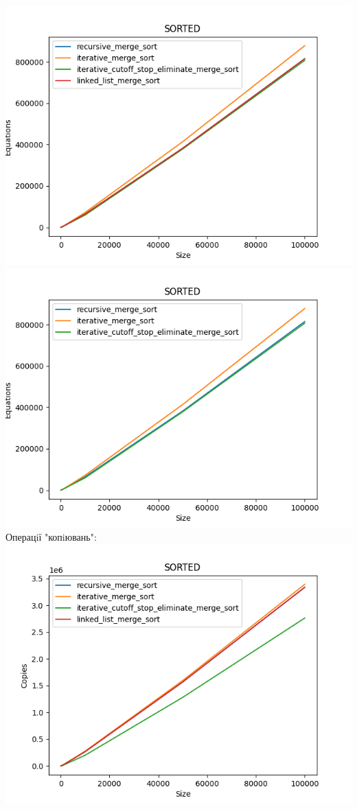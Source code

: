 \documentclass{article}
\begin{document}
        \includegraphics[scale=0.5]{sorted_Equations_4_sorts_6_numbers_50_100to100000.png}
        \includegraphics[scale=0.5]{sorted_Equations_3_sorts_6_numbers_50_100to100000.png}
    \newpage
    Операцiї "копiювань":
    \newline
        \includegraphics[scale=0.5]{sorted_Copies_4_sorts_6_numbers_50_100to100000.png}
\end{document}
